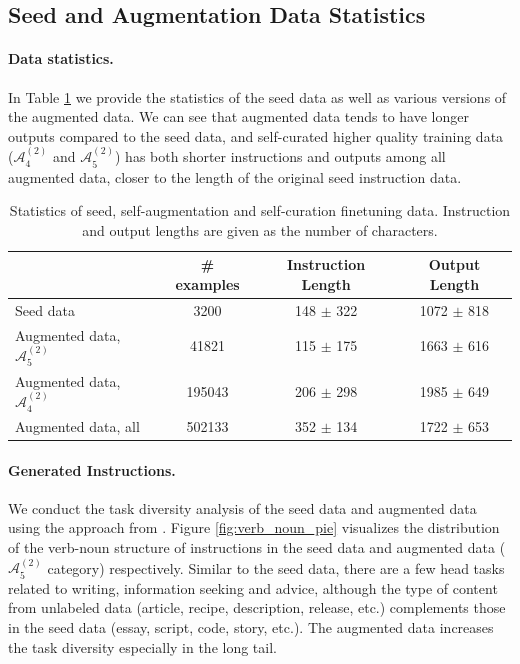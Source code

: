 \subsection{Seed and Augmentation Data Statistics} 

\paragraph{Data statistics.} In Table \ref{tab:train_data_stats} we provide the  statistics of the seed data as well as various versions of the augmented data. We can see that augmented data tends to have longer outputs compared to the seed data, and self-curated higher quality training data ($\mathcal{A}_4^{(2)}$ and $\mathcal{A}_5^{(2)}$) has both shorter instructions and outputs among all augmented data, closer to the length of the original seed instruction data.

\begin{table}[t]
    \caption{Statistics of seed, self-augmentation and self-curation finetuning data. Instruction and output lengths are given as the number of characters.
  \label{tab:train_data_stats}
    }
  \centering
  \small
  \begin{tabular}{lccc}
    \toprule
        & \textbf{\# examples} & \textbf{Instruction Length}  &  \textbf{Output Length}   \\
    \midrule

  Seed data & 3200  &  148 $\pm$ 322 & 1072  $\pm$ 818   \\ 
    \vspace{1mm}
  Augmented data, $\mathcal{A}_{5}^{(2)}$  & 41821 & 115  $\pm$ 175 & 1663  $\pm$ 616  \\
    \vspace{1mm}
   Augmented data, 
  $\mathcal{A}_{4}^{(2)}$  & 195043 & 206  $\pm$ 298 & 1985  $\pm$ 649  \\ 
  Augmented data, all  & 502133  & 352  $\pm$ 134 & 1722  $\pm$ 653  \\  
    \bottomrule
  \end{tabular}
  \vspace{1mm}
\end{table}
\paragraph{Generated Instructions.}  We conduct the task diversity analysis of the seed data and augmented data using the approach from \cite{wang2022self}. Figure \ref{fig:verb_noun_pie} visualizes the distribution of the verb-noun structure of instructions in the seed data and augmented data ($\mathcal{A}_5^{(2)}$ category) respectively. Similar to the seed data, there are a few head tasks related to writing, information seeking and advice, although the type of content from unlabeled data (article, recipe, description, release, etc.) complements those in the seed data (essay, script, code, story, etc.). The augmented data increases the task diversity especially in the long tail. 

